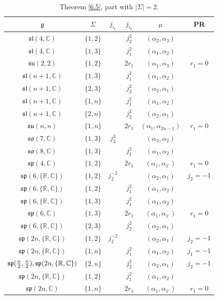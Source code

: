 \documentclass[pdftex]{sigma}
\newcommand{\Si}{\Sigma}
\newcommand{\fg}{\mathfrak g}
\newcommand{\R}{\mathbb{R}}
\newcommand{\C}{\mathbb{C}}
\numberwithin{equation}{section}
\begin{document}
\begin{table}[th!]\centering\caption{Theorem \ref{6.5}, part with $|\Si|=2$.}\label{ahs7}\vspace{1mm}

\begin{tabular}{|c|c|c|c|c|c|}
\hline
$\fg$ & $\Sigma$ & $j_{i_1}$& $j_{i_2}$& $\mu$&PR \\
\hline
\hline
$\mathfrak{sl}(4,\C)$ & $\{1,2\}$ &&$j_2^2$ & $(\alpha_2,\alpha_3)$ & \\
\hline
$\mathfrak{sl}(4,\C)$ & $\{1,3\}$ &&$j_1^2$ &$(\alpha_1,\alpha_2)$& \\
\hline
$\mathfrak{su}(2,2)$&$\{1,2\}$&& $2r_1$&$(\alpha_1,\alpha_{3})$&$r_1=0$\\
\hline
$\mathfrak{sl}(n+1,\C)$ & $\{1,3\}$ &&$j_1^2$ &$(\alpha_1,\alpha_2)$& \\
\hline
$\mathfrak{sl}(n+1,\C)$ & $\{2,3\}$ &&$j_2^2$ & $(\alpha_2,\alpha_1)$ & \\
\hline
$\mathfrak{sl}(n+1,\C)$ & $\{1,n\}$ &&$j_1^2$ &$(\alpha_1,\alpha_2)$& \\
\hline
$\mathfrak{sl}(n+1,\C)$ & $\{2,n\}$ &&$j_2^2$ & $(\alpha_2,\alpha_1)$ & \\
\hline
$\mathfrak{su}(n,n)$&$\{1,n\}$&& $2r_1$&$(\alpha_1,\alpha_{2n-1})$&$r_1=0$\\
\hline
$\mathfrak{so}(7,\C)$&$\{ 1,3\}$&$j_3^3$&& $(\alpha_3,\alpha_2)$& \\
\hline
$\mathfrak{so}(8,\C)$&$\{ 1,3\}$& & $j_1^2$& $(\alpha_1,\alpha_2)$& \\
\hline
$\mathfrak{sp}(4,\mathbb{C})$& $\{1,2\}$ && $2r_1$& $(\alpha_{1},\alpha_{1'})$ & $r_1=0$ \\
\hline
$\mathfrak{sp}(6,\{\R,\C\})$ & $\{1,2\}$ & $j_2^{-2}$ & & $(\alpha_2,\alpha_1)$ & $j_2=-1$ \\
\hline
$\mathfrak{sp}(6,\{\R,\C\})$ & $\{1,2\}$ & &$j_1^2$ & $(\alpha_1,\alpha_2)$&\\
\hline
$\mathfrak{sp}(6,\{\R,\C\})$ & $\{1,3\}$& & $j_1^2$& $(\alpha_1,\alpha_2)$ & \\
\hline
$\mathfrak{sp}(6,\mathbb{C})$& $\{1,3\}$ && $2r_1$& $(\alpha_{1},\alpha_{1'})$ & $r_1=0$ \\
\hline
$\mathfrak{sp}(6,\{\R,\C\})$& $\{2,3\}$ & & $j_2^2$& $(\alpha_2,\alpha_1)$ & \\
\hline
$\mathfrak{sp}(2n,\{\R,\C\})$ & $\{1,2\}$ & $j_2^{-2}$ & & $(\alpha_2,\alpha_1)$ & $j_2=-1$ \\
\hline
$\mathfrak{sp}(2n,\{\R,\C\})$ & $\{1,n\}$& & $j_1^2$& $(\alpha_1,\alpha_2)$ &$j_1=-1$ \\
\hline
$\mathfrak{sp}({n \over 2},{n \over 2}),\mathfrak{sp}(2n,\{\R,\C\})$& $\{2,n\}$ & & $j_2^2$& $(\alpha_2,\alpha_1)$ & $j_2=-1$ \\
\hline
$\mathfrak{sp}(2n,\{\R,\C\})$ & $\{1,2\}$ & &$j_1^2$ & $(\alpha_1,\alpha_2)$&\\
\hline
$\mathfrak{sp}(2n,\mathbb{C})$& $\{1,n\}$ && $2r_1$& $(\alpha_{1},\alpha_{1'})$ & $r_1=0$ \\
\hline
\end{tabular}
\end{table}
\end{document}
